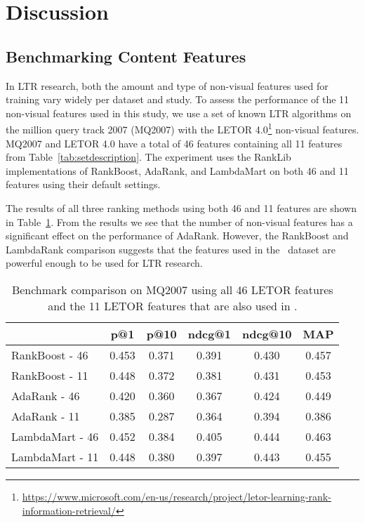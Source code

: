 
\section{Discussion}
\label{sec:discussion}
\subsection{Benchmarking Content Features}

In \ac{LTR} research, both the amount and type of non-visual features used for training vary widely per dataset and study.
To assess the performance of the 11 non-visual features used in this study, we use a set of known LTR algorithms on the million query track 2007 (MQ2007)\cite{allan2007million} with the LETOR 4.0\footnote{\url{https://www.microsoft.com/en-us/research/project/letor-learning-rank-information-retrieval/}} non-visual features.
MQ2007 and LETOR 4.0 have a total of 46 features containing all 11 features from Table~\ref{tab:setdescription}.
The experiment uses the RankLib implementations of RankBoost, AdaRank, and LambdaMart on both 46 and 11 features using their default settings. 

The results of all three ranking methods using both 46 and 11 features are shown in Table~\ref{tab:11vs46}.
From the results we see that the number of non-visual features has a significant effect on the performance of AdaRank. However, the RankBoost and LambdaRank comparison suggests that the features used in the \datasetname~dataset are powerful enough to be used for \ac{LTR} research.

\begin{table}[h]
\caption{Benchmark comparison on MQ2007 using all 46 LETOR features and the 11 LETOR features that are also used in \datasetname.}
\label{tab:11vs46}
\centering
\begin{tabular}{lccccc}
\toprule
           & p@1  & p@10   & ndcg@1 & ndcg@10 & MAP \\ 
\midrule
RankBoost - 46 & 0.453 & 0.371 & 0.391 & 0.430  & 0.457 \\
RankBoost - 11 & 0.448 & 0.372 & 0.381  & 0.431   & 0.453 \\
\midrule
AdaRank - 46  & 0.420 & 0.360 & 0.367 & 0.424  & 0.449 \\
AdaRank - 11  & 0.385 & 0.287 & 0.364  & 0.394   & 0.386 \\ 
\midrule
LambdaMart - 46 & 0.452 & 0.384 & 0.405 & 0.444  & 0.463 \\
LambdaMart - 11 & 0.448 & 0.380 & 0.397  & 0.443   & 0.455 \\
\bottomrule
\end{tabular}
\end{table}

